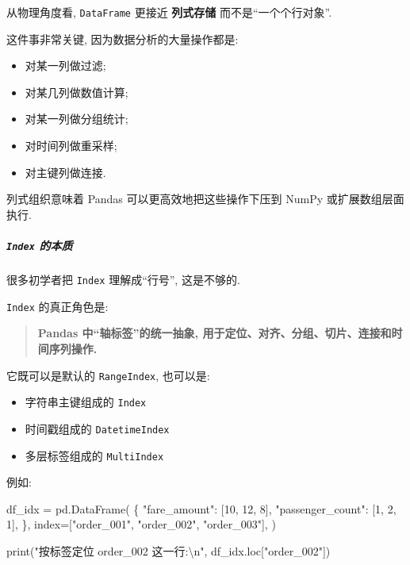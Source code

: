 \documentclass[11pt]{article}
\providecommand{\tightlist}{%
      \setlength{\itemsep}{0pt}\setlength{\parskip}{0pt}}
\newenvironment{Shaded}{}{}
\newcommand{\DecValTok}[1]{\textcolor[rgb]{0.25,0.63,0.44}{{#1}}}
\newcommand{\CharTok}[1]{\textcolor[rgb]{0.25,0.44,0.63}{{#1}}}
\newcommand{\StringTok}[1]{\textcolor[rgb]{0.25,0.44,0.63}{{#1}}}
\newcommand{\NormalTok}[1]{{#1}}
\newcommand{\OperatorTok}[1]{\textcolor[rgb]{0.40,0.40,0.40}{{#1}}}
\newcommand{\BuiltInTok}[1]{{#1}}
\begin{document}
从物理角度看, \texttt{DataFrame} 更接近 \textbf{列式存储}
而不是``一个个行对象''.

这件事非常关键, 因为数据分析的大量操作都是:

\begin{itemize}
\tightlist
\item
  对某一列做过滤;
\item
  对某几列做数值计算;
\item
  对某一列做分组统计;
\item
  对时间列做重采样;
\item
  对主键列做连接.
\end{itemize}

列式组织意味着 Pandas 可以更高效地把这些操作下压到 NumPy
或扩展数组层面执行.

    \subparagraph{\texorpdfstring{\texttt{Index}
\textbar 的本质}{Index \textbar 的本质}}\label{index-ux7684ux672cux8d28}

    很多初学者把 \texttt{Index} 理解成``行号'', 这是不够的.

\texttt{Index} 的真正角色是:

\begin{quote}
\textbf{Pandas 中``轴标签''的统一抽象,
用于定位、对齐、分组、切片、连接和时间序列操作.}
\end{quote}

它既可以是默认的 \texttt{RangeIndex}, 也可以是:

\begin{itemize}
\tightlist
\item
  字符串主键组成的 \texttt{Index}
\item
  时间戳组成的 \texttt{DatetimeIndex}
\item
  多层标签组成的 \texttt{MultiIndex}
\end{itemize}

例如:

\begin{Shaded}
\begin{Highlighting}[]
\NormalTok{df\_idx }\OperatorTok{=}\NormalTok{ pd.DataFrame(}
\NormalTok{    \{}
        \StringTok{"fare\_amount"}\NormalTok{: [}\DecValTok{10}\NormalTok{, }\DecValTok{12}\NormalTok{, }\DecValTok{8}\NormalTok{],}
        \StringTok{"passenger\_count"}\NormalTok{: [}\DecValTok{1}\NormalTok{, }\DecValTok{2}\NormalTok{, }\DecValTok{1}\NormalTok{],}
\NormalTok{    \},}
\NormalTok{    index}\OperatorTok{=}\NormalTok{[}\StringTok{"order\_001"}\NormalTok{, }\StringTok{"order\_002"}\NormalTok{, }\StringTok{"order\_003"}\NormalTok{],}
\NormalTok{)}

\BuiltInTok{print}\NormalTok{(}\StringTok{"按标签定位 order\_002 这一行:}\CharTok{\textbackslash{}n}\StringTok{"}\NormalTok{, df\_idx.loc[}\StringTok{"order\_002"}\NormalTok{])}
\end{Highlighting}
\end{Shaded}
\end{document}
